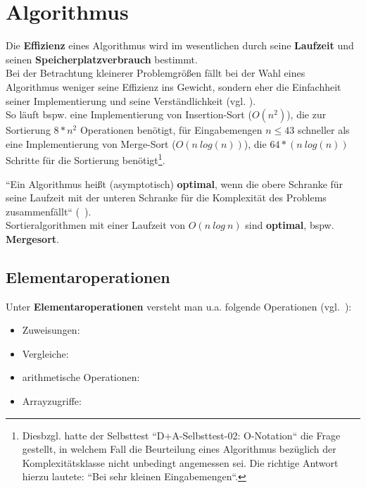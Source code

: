 \section{Algorithmus}

Die \textbf{Effizienz} eines Algorithmus wird im wesentlichen durch seine \textbf{Laufzeit} und seinen \textbf{Speicherplatzverbrauch} bestimmt.\\



\noindent
Bei der Betrachtung kleinerer Problemgrößen fällt bei der Wahl eines Algorithmus weniger seine Effizienz ins Gewicht, sondern eher die Einfachheit seiner Implementierung und seine Verständlichkeit (vgl. \cite[5 f.]{GD18a}).\\
So läuft bspw. eine Implementierung von Insertion-Sort ($O(n^2)$), die zur Sortierung $8*n^2$ Operationen benötigt, für Eingabemengen $n \leq 43$ schneller als eine Implementierung von Merge-Sort ($O(n\ log(n))$), die $64 * (n\ log(n))$ Schritte für die Sortierung benötigt\footnote{
Diesbzgl. hatte der Selbsttest ``D+A-Selbsttest-02: O-Notation`` die Frage gestellt, in welchem Fall die Beurteilung eines Algorithmus bezüglich der Komplexitätsklasse nicht unbedingt angemessen sei. Die richtige Antwort hierzu lautete: ``Bei sehr kleinen Eingabemengen``.
}.\\

\begin{tcolorbox}[title={Optimaler Algorithmus}]
    ``Ein Algorithmus heißt (asymptotisch) \textbf{optimal}, wenn die obere Schranke für seine Laufzeit mit der unteren Schranke für die Komplexität des Problems zusammenfällt`` (~\cite[20]{GD18a}).\\

    \noindent
    Sortieralgorithmen mit einer Laufzeit von $O(n\ log\ n)$ sind \textbf{optimal}, bspw. \textbf{Mergesort}.
\end{tcolorbox}



\subsection{Elementaroperationen}

Unter \textbf{Elementaroperationen} versteht man u.a. folgende Operationen (vgl.~\cite[6]{GD18a}):

\begin{itemize}
    \item Zuweisungen: 
    \item Vergleiche: 
    \item arithmetische Operationen: 
    \item Arrayzugriffe: 
\end{itemize}

